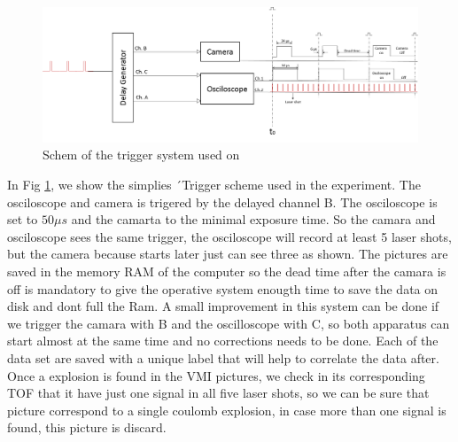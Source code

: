 \begin{figure}[hbtp]
\label{fig:triggers}
\centering
\includegraphics[scale=1]{../Images/Trigger scheme.png}
\caption[Trigger Scheme]{Schem of the trigger system used on }
\end{figure}

In Fig \ref{fig:triggers}, we show the simplies ´Trigger scheme used in the experiment. The osciloscope and camera is trigered by the delayed channel B. The osciloscope is set to $50\mu s$ and the camarta to the minimal exposure time. So the camara and osciloscope sees the same trigger, the osciloscope will record at least 5 laser shots, but the camera because starts later just can see three as shown. The pictures are saved in the memory RAM of the computer so the dead time after the camara is off is mandatory to give the operative system enougth time to save the data on disk and dont full the Ram. A small improvement in this system can be done if we trigger the camara with B and the oscilloscope with C, so both apparatus can start almost at the same time and no corrections needs to be done. Each of the data set are saved with a unique label that will help to correlate the data after. Once a explosion is found in the VMI pictures, we check in its corresponding TOF that it have just one signal in all five laser shots, so we can be sure that picture correspond to a single coulomb explosion, in case more than one signal is found, this picture is discard. 




